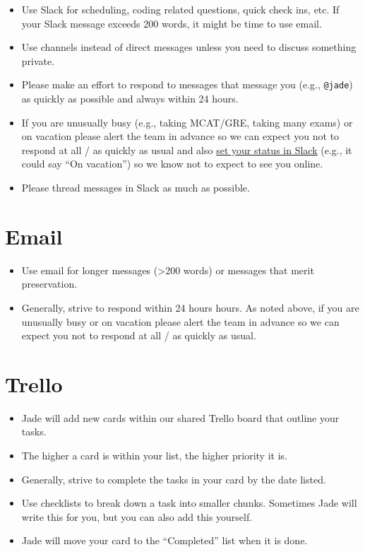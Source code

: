 \documentclass[
]{book}
\providecommand{\tightlist}{%
  \setlength{\itemsep}{0pt}\setlength{\parskip}{0pt}}
\begin{document}
\begin{itemize}
\tightlist
\item
  Use Slack for scheduling, coding related questions, quick check ins, etc. If your Slack message exceeds 200 words, it might be time to use email.
\item
  Use channels instead of direct messages unless you need to discuss something private.
\item
  Please make an effort to respond to messages that message you (e.g., \texttt{@jade}) as quickly as possible and always within 24 hours.
\item
  If you are unusually busy (e.g., taking MCAT/GRE, taking many exams) or on vacation please alert the team in advance so we can expect you not to respond at all / as quickly as usual and also \href{https://get.slack.help/hc/en-us/articles/201864558-Set-your-Slack-status-and-availability}{set your status in Slack} (e.g., it could say ``On vacation'') so we know not to expect to see you online.
\item
  Please thread messages in Slack as much as possible.
\end{itemize}

\hypertarget{email}{%
\section{Email}\label{email}}

\begin{itemize}
\tightlist
\item
  Use email for longer messages (\textgreater200 words) or messages that merit preservation.
\item
  Generally, strive to respond within 24 hours hours. As noted above, if you are unusually busy or on vacation please alert the team in advance so we can expect you not to respond at all / as quickly as usual.
\end{itemize}

\hypertarget{trello}{%
\section{Trello}\label{trello}}

\begin{itemize}
\tightlist
\item
  Jade will add new cards within our shared Trello board that outline your tasks.
\item
  The higher a card is within your list, the higher priority it is.
\item
  Generally, strive to complete the tasks in your card by the date listed.
\item
  Use checklists to break down a task into smaller chunks. Sometimes Jade will write this for you, but you can also add this yourself.
\item
  Jade will move your card to the ``Completed'' list when it is done.
\end{itemize}
\end{document}
